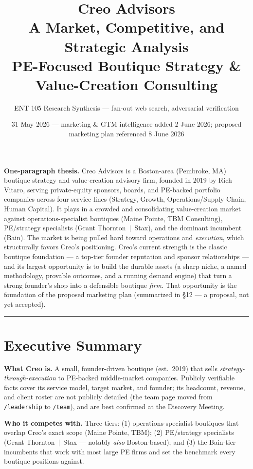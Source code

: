 \documentclass[11pt]{article}
\title{\textbf{Creo Advisors}\\[2pt]
\large A Market, Competitive, and Strategic Analysis\\[6pt]
\normalsize PE-Focused Boutique Strategy \& Value-Creation Consulting}
\author{\normalsize ENT 105 Research Synthesis --- fan-out web search, adversarial verification}
\date{\normalsize 31 May 2026 --- marketing \& GTM intelligence added 2 June 2026;
proposed marketing plan referenced 8 June 2026}
\begin{document}
\maketitle

\begin{takeaway}
\textbf{One-paragraph thesis.} Creo Advisors is a Boston-area (Pembroke, MA)
boutique strategy and value-creation advisory firm, founded in 2019 by
Rich Vitaro, serving private-equity sponsors, boards, and PE-backed portfolio
companies across four service lines (Strategy, Growth, Operations/Supply Chain,
Human Capital). It plays in a crowded and consolidating value-creation market
against operations-specialist boutiques (Maine Pointe, TBM Consulting),
PE/strategy specialists (Grant Thornton~$\vert$~Stax), and the dominant
incumbent (Bain). The market is being pulled hard toward operations and
\emph{execution}, which structurally favors Creo's positioning. Creo's current
strength is the classic boutique foundation --- a top-tier founder reputation and
sponsor relationships --- and its largest opportunity is to build the durable
assets (a sharp niche, a named methodology, provable outcomes, and a running
demand engine) that turn a strong founder's shop into a defensible boutique
\emph{firm}. That opportunity is the foundation of the proposed marketing plan
(summarized in \S12 --- a proposal, not yet accepted).
\end{takeaway}

\tableofcontents
\vspace{1em}
\hrule
\vspace{1em}

\section{Executive Summary}

\textbf{What Creo is.} A small, founder-driven boutique (est.\ 2019) that sells
\emph{strategy-through-execution} to PE-backed middle-market companies. Publicly
verifiable facts cover its service model, target market, and founder; its
headcount, revenue, and client roster are not publicly detailed (the team page
moved from \texttt{/leadership} to \texttt{/team}), and are best confirmed at the
Discovery Meeting.

\textbf{Who it competes with.} Three tiers: (1) operations-specialist boutiques
that overlap Creo's exact scope (Maine Pointe, TBM); (2) PE/strategy specialists
(Grant Thornton~$\vert$~Stax --- notably \emph{also} Boston-based); and (3) the
Bain-tier incumbents that work with most large PE firms and set the benchmark
every boutique positions against.
\end{document}
